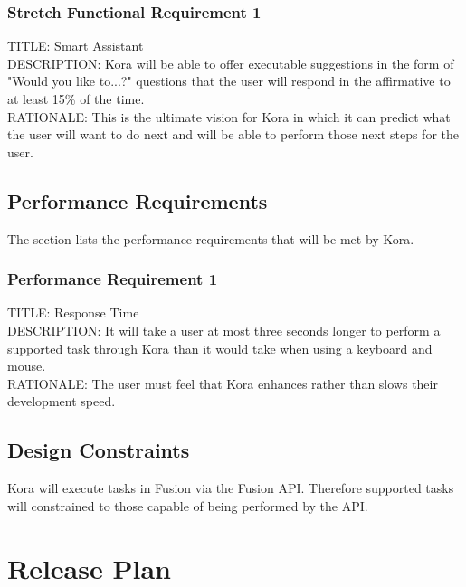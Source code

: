 \documentclass[onecolumn, draftclsnofoot,10pt, compsoc]{IEEEtran}
\def \botname{Kora\xspace}
\begin{document}
        
        \subsubsection{Stretch Functional Requirement 1}
        TITLE: Smart Assistant \\
        DESCRIPTION: \botname will be able to offer executable suggestions in the form of "Would you like to...?" questions that the user will respond in the affirmative to at least 15\% of the time. \\
        RATIONALE: This is the ultimate vision for \botname in which it can predict what the user will want to do next and will be able to perform those next steps for the user. 
        
    \subsection{Performance Requirements}
        The section lists the performance requirements that will be met by \botname.
        
        \subsubsection{Performance Requirement 1}
        TITLE: Response Time \\
        DESCRIPTION: It will take a user at most three seconds longer to perform a supported task through \botname than it would take when using a keyboard and mouse. \\
        RATIONALE: The user must feel that \botname enhances rather than slows their development speed.
        
    \subsection{Design Constraints}
        \botname will execute tasks in Fusion via the Fusion API. 
        Therefore supported tasks will constrained to those capable of being performed by the API.
        
\section{Release Plan}
\end{document}
